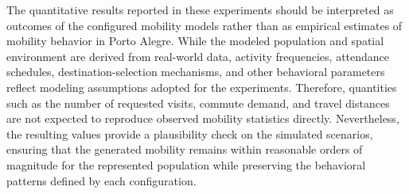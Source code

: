 The quantitative results reported in these experiments should be interpreted as outcomes of the configured mobility models rather than as empirical estimates of mobility behavior in Porto Alegre. While the modeled population and spatial environment are derived from real-world data, activity frequencies, attendance schedules, destination-selection mechanisms, and other behavioral parameters reflect modeling assumptions adopted for the experiments. Therefore, quantities such as the number of requested visits, commute demand, and travel distances are not expected to reproduce observed mobility statistics directly. Nevertheless, the resulting values provide a plausibility check on the simulated scenarios, ensuring that the generated mobility remains within reasonable orders of magnitude for the represented population while preserving the behavioral patterns defined by each configuration.

